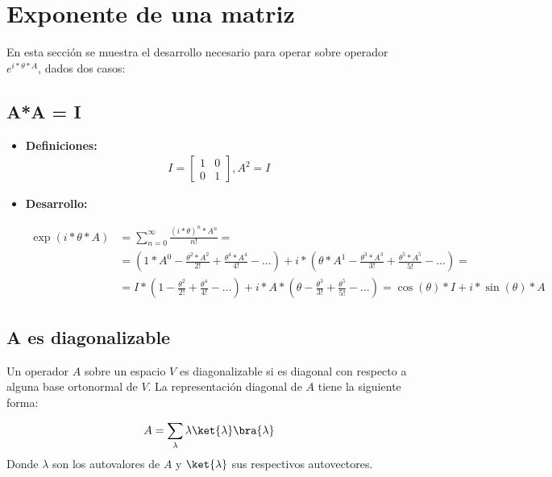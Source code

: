 \section{Exponente de una matriz}

En esta sección se muestra el desarrollo necesario para operar sobre operador $e^{i*\theta*A}$, dados dos casos:

\subsection{A*A = I\label{sec:8-A_A_es_I}}

\begin{itemize}
\item \textbf{Definiciones:}
  \begin{align*}
    I = \begin{bmatrix}
      1 & 0 \\
      0 & 1
    \end{bmatrix}
    , A^2 = I
  \end{align*}

\item \textbf{Desarrollo:}

  \begin{align*}
    \exp(i*\theta*A) &= \sum_{n = 0}^{\infty} \frac{{(i*\theta)}^n * A^n}{n!} = \\
                &= (1*A^0 - \frac{\theta^2*A^2}{2!} + \frac{\theta^4*A^4}{4!} - \ldots) +
                  i*(\theta*A^1 - \frac{\theta^3*A^3}{3!} + \frac{\theta^5*A^5}{5!} - \ldots) = \\
                &= I*(1 - \frac{\theta^2}{2!} + \frac{\theta^4}{4!} - \ldots) +
                  i*A*(\theta - \frac{\theta^3}{3!} + \frac{\theta^5}{5!} - \ldots)
                  = \cos(\theta)*I + i*\sin(\theta)*A
  \end{align*}
\end{itemize}

\subsection{A es diagonalizable\label{sec:8-funcion A diagonalizable}}

Un operador $A$ sobre un espacio $V$ es diagonalizable si es diagonal con respecto a alguna base ortonormal de $V$. La representación diagonal de $A$ tiene la siguiente forma:

\begin{align*}
  A = \sum_\lambda \lambda \ket{\lambda}\bra{\lambda}
\end{align*}
Donde $\lambda$ son los autovalores de $A$ y $\ket{\lambda}$ sus respectivos autovectores.


